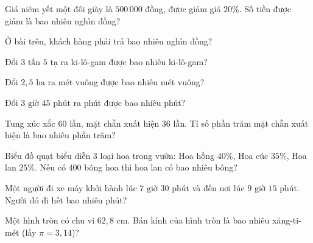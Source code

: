 \begin{ex}
  Giá niêm yết một đôi giày là $500\,000$ đồng, được giảm giá $20\%$. Số tiền được giảm là bao nhiêu nghìn đồng?
\end{ex}

\begin{ex}
  Ở bài trên, khách hàng phải trả bao nhiêu nghìn đồng?
\end{ex}

\begin{ex}
  Đổi $3\text{ tấn } 5\text{ tạ}$ ra ki-lô-gam được bao nhiêu ki-lô-gam?
\end{ex}

\begin{ex}
  Đổi $2{,}5\text{ ha}$ ra mét vuông được bao nhiêu mét vuông?
\end{ex}

\begin{ex}
  Đổi $3\text{ giờ } 45\text{ phút}$ ra phút được bao nhiêu phút?
\end{ex}

\begin{ex}
  Tung xúc xắc 60 lần, mặt chẵn xuất hiện 36 lần. Tỉ số phần trăm mặt chẵn xuất hiện là bao nhiêu phần trăm?
\end{ex}

\begin{ex}
  Biểu đồ quạt biểu diễn 3 loại hoa trong vườn: Hoa hồng $40\%$, Hoa cúc $35\%$, Hoa lan $25\%$. Nếu có 400 bông hoa thì hoa lan có bao nhiêu bông?
\end{ex}

\begin{ex}
  Một người đi xe máy khởi hành lúc $7\text{ giờ } 30\text{ phút}$ và đến nơi lúc $9\text{ giờ } 15\text{ phút}$. Người đó đi hết bao nhiêu phút?
\end{ex}

\begin{ex}
  Một hình tròn có chu vi $62{,}8\text{ cm}$. Bán kính của hình tròn là bao nhiêu xăng-ti-mét (lấy $\pi = 3{,}14$)?
\end{ex}

